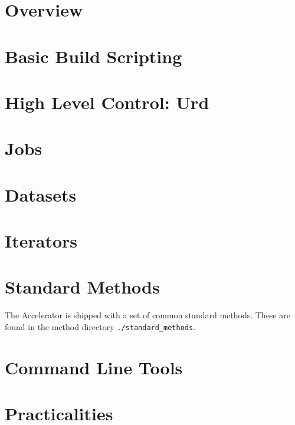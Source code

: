\documentclass[a4paper]{book}
\begin{document}
\chapter{Overview}


\chapter{Basic Build Scripting}


\chapter{High Level Control:  Urd}


\chapter{Jobs}


\chapter{Datasets}


\chapter{Iterators}


\chapter{Standard Methods}
The Accelerator is shipped with a set of common standard methods.
These are found in the method directory \texttt{./standard\_methods}.


\chapter{Command Line Tools}


\appendix

\chapter{Practicalities}


\printindex



\end{document}
